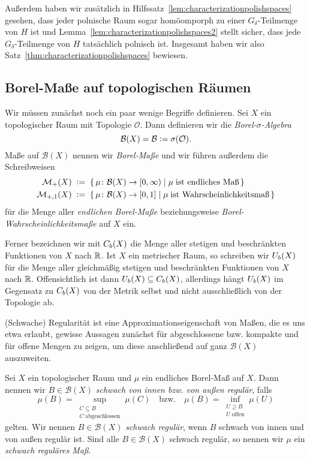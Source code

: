 \documentclass[../main/main.tex]{subfiles}
\begin{document}
	Außerdem haben wir zusätzlich in Hilfssatz~\ref{lem:characterizationpolishspaces} 
	gesehen, dass jeder polnische Raum sogar homöomporph zu einer 
	$G_\delta$-Teilmenge von $H$ ist und  
	Lemma~\ref{lem:characterizationpolishspaces2} stellt sicher, 
	dass jede $G_\delta$-Teilmenge von $H$ tatsächlich polnisch ist. 
	Insgesamt haben wir also Satz~\ref{thm:characterizationpolishspaces}
	bewiesen.
	
	\subsection{Borel-Maße auf topologischen Räumen}
	
	Wir müssen zunächst noch ein paar wenige Begriffe definieren.
	Sei $X$ ein topologischer Raum mit Topologie $\mathcal{O}$. Dann definieren wir die
	\emph{Borel-$\sigma$-Algebra} 
	$$\mathcal{B}(X) = \mathcal{B} \vcentcolon = \sigma(\mathcal{O}) \text{.}$$
	Maße auf $\mathcal{B}(X)$ nennen wir \emph{Borel-Maße} und wir führen außerdem die Schreibweisen
	\begin{align*}
		\mathcal{M}_{+}(X)  \; &\vcentcolon = \; \left\{\, \mu \colon \mathcal{B}(X) \to [0,\infty) \; \middle| \; \mu \; 
			\text{ist endliches Maß} \,\right\} \\
		\mathcal{M}_{+,1}(X) \; &\vcentcolon = \; \left\{\, \mu \colon \mathcal{B}(X) \to [0,1] \; \middle| \; \mu \; 
			\text{ist Wahrscheinlichkeitsmaß} \,\right\}
	\end{align*}
	für die Menge aller \emph{endlichen Borel-Maße} beziehungsweise \emph{Borel-Wahrscheinlichkeitsmaße} auf $X$ ein.
	
	Ferner bezeichnen wir mit $C_b(X)$ die Menge aller stetigen und beschränkten Funktionen von $X$ nach $\mathbb{R}$. 
	Ist $X$ ein metrischer Raum, so schreiben wir $U_b(X)$ für die Menge aller gleichmäßig stetigen und beschränkten Funktionen
	von $X$ nach $\mathbb{R}$. Offensichtlich ist dann $U_b(X) \subseteq C_b(X)$, allerdings hängt $U_b(X)$ im Gegensatz 
	zu $C_b(X)$ von der Metrik selbst und nicht ausschließlich von der Topologie ab.
	
	
	(Schwache) Regularität ist eine 
	Approximationseigenschaft von Maßen, die es uns etwa erlaubt, gewisse Aussagen 
	zunächst für abgeschlossene bzw. kompakte und für offene Mengen zu zeigen, um diese 
	anschließend auf ganz $\mathcal{B}(X)$ auszuweiten. 
	
	\begin{Definition}
		\label{def:regularity}
		Sei $X$ ein topologischer Raum und $\mu$ ein endliches Borel-Maß auf $X$. 
		Dann nennen wir $B \in \mathcal{B}(X)$ \emph{schwach von 
			innen bzw. von außen regulär}, falls
		$$\mu(B) = \sup_{\substack{C \subseteq B \\ C \; \text{abgeschlossen}}} \mu(C) 
		\quad \text{bzw.} \quad \mu(B) = \inf_{\substack{U \supseteq B \\ U \; \text{offen}}} 
		\mu(U)$$
		gelten. Wir nennen $B \in \mathcal{B}(X)$ \emph{schwach regulär}, wenn $B$ schwach von innen und 
		von außen regulär ist. Sind alle $B \in \mathcal{B}(X)$ schwach regulär, 
		so nennen wir $\mu$ ein \emph{schwach reguläres Maß}.
	\end{Definition}
	
\end{document}
